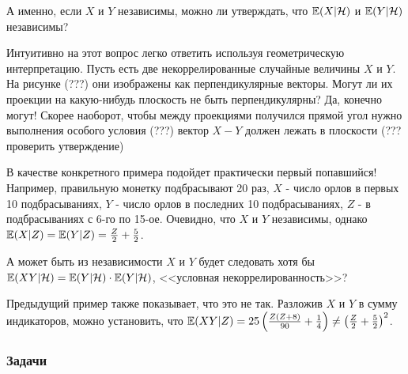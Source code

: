 {А именно, если $X$ и $Y$ независимы, можно ли утверждать, что $\mathbb{E}(X|\mathcal{H})$ и $\mathbb{E}(Y|\mathcal{H})$ независимы?

Интуитивно на этот вопрос легко ответить используя геометрическую интерпретацию. Пусть есть две некоррелированные случайные величины $X$ и $Y$. На рисунке (???) они изображены как перпендикулярные векторы. Могут ли их проекции на какую-нибудь плоскость не быть перпендикулярны? Да, конечно могут! Скорее наоборот, чтобы между проекциями получился прямой угол нужно выполнения особого условия (???) вектор $X-Y$ должен лежать в плоскости (??? проверить утверждение)

В качестве конкретного примера подойдет практически первый попавшийся! Например, правильную монетку подбрасывают 20 раз, $X$ - число орлов в первых 10 подбрасываниях, $Y$ - число орлов в последних 10 подбрасываниях, $Z$ - в подбрасываниях с 6-го по 15-ое. Очевидно, что $X$ и $Y$ независимы, однако $\mathbb{E}(X|Z)=\mathbb{E}(Y|Z)=\frac{Z}{2}+\frac{5}{2}$.

А может быть из независимости $X$ и $Y$ будет следовать хотя бы $\mathbb{E}(XY|\mathcal{H})=\mathbb{E}(Y|\mathcal{H})\cdot \mathbb{E}(Y|\mathcal{H})$, <<условная некоррелированность>>?

Предыдущий пример также показывает, что это не так. Разложив $X$ и $Y$ в сумму индикаторов, можно установить, что $\mathbb{E}(XY|Z)=25\left(\frac{Z(Z+8)}{90}+\frac{1}{4}\right)\neq \left(\frac{Z}{2}+\frac{5}{2}\right)^{2}$.







}
\subsubsection*{Задачи}










